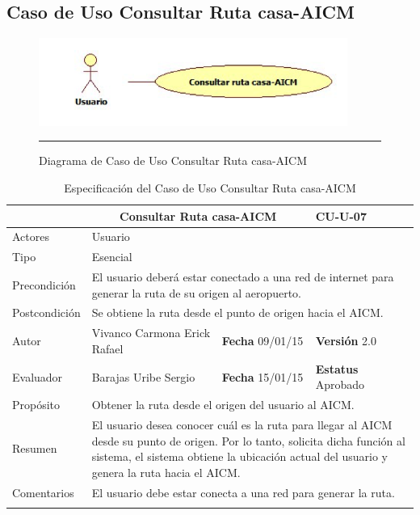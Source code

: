 \subsection{Caso de Uso Consultar Ruta casa-AICM}

\begin{figure}[htbp]
	\centering
		\includegraphics[width=0.9\textwidth]{Figuras/cuConsultarRutacasa-AICM.png}
		\rule{30em}{0.5pt}
	\caption[Diagrama de Caso de Uso Consultar Ruta casa-AICM]{Diagrama de Caso de Uso Consultar Ruta casa-AICM}
	\label{fig:cuConsultarRutacasa-AICM}
\end{figure}

\begin{longtable}{|p{2.5cm}|p{6.4cm}|p{2cm}|p{2cm}|}
	\hline
		\rowcolor[RGB]{255,102,102}{Caso de Uso}&\multicolumn{2}{c}{Consultar Ruta casa-AICM}&{\textbf{CU-U-07}}\\
	\hline
		{Actores}&\multicolumn{3}{p{11.2cm}|}{Usuario}\\
	\hline
		{Tipo}&\multicolumn{3}{p{11.2cm}|}{Esencial}\\
	\hline
		{Precondición}&\multicolumn{3}{p{11.2cm}|}{El usuario deberá estar conectado a una red de internet para generar la ruta de su origen al aeropuerto.}\\
	\hline
		{Postcondición}&\multicolumn{3}{p{11.2cm}|}{Se obtiene la ruta desde el punto de origen hacia el AICM.}\\
	\hline
		{Autor}&{Vivanco Carmona Erick Rafael}&{\textbf{Fecha} 09/01/15}&{\textbf{Versión} 2.0}\\
			\hline
		{Evaluador}&{Barajas Uribe Sergio}&{\textbf{Fecha} 15/01/15}&{\textbf{Estatus} Aprobado}\\
	\hline
		{Propósito}&\multicolumn{3}{p{11.2cm}|}{Obtener la ruta desde el origen del usuario al AICM.}\\
	\hline
		{Resumen}&\multicolumn{3}{p{11.2cm}|}{El usuario desea conocer cuál es la ruta para llegar al AICM desde su punto de origen. Por lo tanto, solicita dicha función al sistema, el sistema obtiene la ubicación actual del usuario y  genera la ruta hacia el AICM.}\\	
	\hline
		{Comentarios}&\multicolumn{3}{p{11.2cm}|}{El usuario debe estar conecta a una red para generar la ruta.}\\
	\hline
	\caption[Especificación del Caso de Uso Consultar Ruta casa-AICM]{Especificación del Caso de Uso Consultar Ruta casa-AICM}
    	\label{tab:cuConsultarRutacasa-AICM}
\end{longtable}

